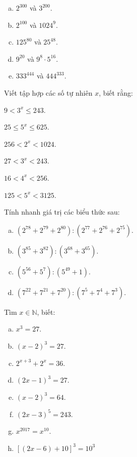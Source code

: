 \begin{bt}
\begin{multicols}{2}
\begin{enumerate}[a)]
\item $2^{300}$ và $3^{200}$.                
\item $2^{100}$ và ${1024}^9$.                 
\item ${125}^{80}$ và ${25}^{48}$.        
\item $9^{20}$ và ${9^8} \cdot {5^{16}}$.          
\item ${333}^{444}$ và ${444}^{333}$.     
\end{enumerate}
\end{multicols}
\end{bt}   \begin{bt}
 Viết tập hợp các số tự nhiên $x$, biết rằng:
\begin{listEX}[2]
\item  $9<{{3}^{x}}\le 243$. 
\item $25\le {{5}^{x}}\le 625$. 
\item $256<{{2}^{x}}<1024$.
\item $27<{{3}^{x}}<243$.
\item $16<{{4}^{x}}<256$.
\item $125<{{5}^{x}}<3125$.
\end{listEX}


\end{bt}   \begin{bt}
Tính nhanh giá trị các biểu thức sau:
\begin{enumerate}[a)]
\item $\left( {{2}^{78}}+{{2}^{79}}+{{2}^{80}} \right):\left( {{2}^{77}}+{{2}^{76}}+{{2}^{75}} \right)$. 
\item $\left( {{3}^{85}}+{{3}^{82}} \right):\left( {{3}^{68}}+{{3}^{65}} \right)$.
\item $\left( {{5}^{56}}+{{5}^{7}} \right):\left( {{5}^{49}}+1 \right)$. 
\item $\left( {{7}^{22}}+{{7}^{21}}+{{7}^{20}} \right):\left( {{7}^{5}}+{{7}^{4}}+{{7}^{3}} \right)$.
\end{enumerate}


\end{bt}   \begin{bt}
Tìm $x \in \mathbb{N}$, biết:
\begin{multicols}{2}
 \begin{enumerate}[a)]
\item   ${{x}^{3}}=27$. 
\item $(x-2)^3 = 27$.
\item $2^{x+3} + 2^x =36$.  
\item ${{\left( 2x-1 \right)}^{3}}=27$. 
\item ${{\left( x-2 \right)}^{3}}=64$.
\item ${{\left( 2x-3 \right)}^{5}}=243$.    
\item ${{x}^{2017}}={{x}^{10}}$.
\item $\left[ (2x-6) +10\right]^3 = 10^3$
\end{enumerate}
\end{multicols}
\end{bt} 
